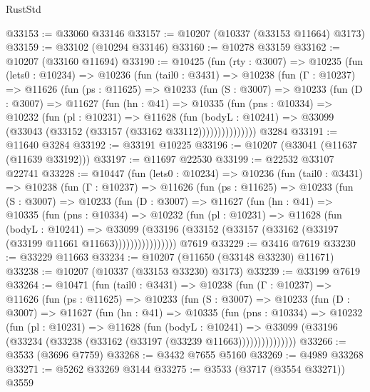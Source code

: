 \begin{lexlean}{RustStd}
\begin{coremodule}
@33153 := @33060 @33146
@33157 := @10207 (@10337 (@33153 @11664) @3173)
@33159 := @33102 (@10294 @33146)
@33160 := @10278 @33159
@33162 := @10207 (@33160 @11694)
@33190 := @10425
    (fun (rty : @3007) =>
    @10235
      (fun (lets0 : @10234) =>
      @10236
        (fun (tail0 : @3431) =>
        @10238
          (fun (Γ : @10237) =>
          @11626
            (fun (ps : @11625) =>
            @10233
              (fun (S : @3007) =>
              @10233
                (fun (D : @3007) =>
                @11627
                  (fun (hn : @41) =>
                  @10335
                    (fun (pns : @10334) =>
                    @10232
                      (fun (pl : @10231) =>
                      @11628
                        (fun (bodyL : @10241) =>
                        @33099 (@33043 (@33152 (@33157 (@33162 @33112)))))))))))))))
    @3284
@33191 := @11640 @3284
@33192 := @33191 @10225
@33196 := @10207 (@33041 (@11637 (@11639 @33192)))
@33197 := @11697 @22530
@33199 := @22532 @33107 @22741
@33228 := @10447
    (fun (lets0 : @10234) =>
    @10236
      (fun (tail0 : @3431) =>
      @10238
        (fun (Γ : @10237) =>
        @11626
          (fun (ps : @11625) =>
          @10233
            (fun (S : @3007) =>
            @10233
              (fun (D : @3007) =>
              @11627
                (fun (hn : @41) =>
                @10335
                  (fun (pns : @10334) =>
                  @10232
                    (fun (pl : @10231) =>
                    @11628
                      (fun (bodyL : @10241) =>
                      @33099
                        (@33196
                          (@33152 (@33157 (@33162 (@33197 (@33199 @11661 @11663))))))))))))))))
    @7619
@33229 := @3416 @7619
@33230 := @33229 @11663
@33234 := @10207 (@11650 (@33148 @33230) @11671)
@33238 := @10207 (@10337 (@33153 @33230) @3173)
@33239 := @33199 @7619
@33264 := @10471
    (fun (tail0 : @3431) =>
    @10238
      (fun (Γ : @10237) =>
      @11626
        (fun (ps : @11625) =>
        @10233
          (fun (S : @3007) =>
          @10233
            (fun (D : @3007) =>
            @11627
              (fun (hn : @41) =>
              @10335
                (fun (pns : @10334) =>
                @10232
                  (fun (pl : @10231) =>
                  @11628
                    (fun (bodyL : @10241) =>
                    @33099 (@33196 (@33234 (@33238 (@33162 (@33197 (@33239 @11663)))))))))))))))
@33266 := @3533 (@3696 @7759)
@33268 := @3432 @7655 @5160
@33269 := @4989 @33268
@33271 := @5262 @33269 @3144
@33275 := @3533 (@3717 (@3554 @33271)) @3559

\end{coremodule}
\end{lexlean}
